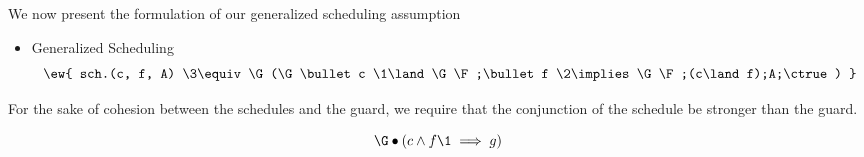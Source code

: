 We now present the formulation of our generalized scheduling assumption
\begin{itemize}
\item Generalized Scheduling
	\begin{equation}
			\label{eq:sch}
		\ew{ sch.(c, f, A)  \3\equiv  
			\G (\G \bullet c \1\land \G \F;\bullet f \2\implies \G \F;(c\land f);A;\ctrue) }
	\end{equation}
\end{itemize}


For the sake of cohesion between the schedules and the guard, we require that the conjunction of the schedule be stronger than the guard.

\begin{equation}
\G \bullet (c \land f \1\implies g) 
\end{equation}

